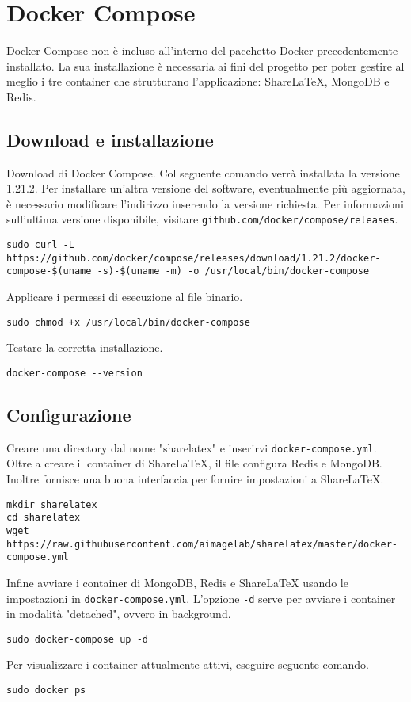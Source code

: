 \section{Docker Compose}
Docker Compose non è incluso all'interno del pacchetto Docker precedentemente installato. La sua installazione è necessaria ai fini del progetto per poter gestire al meglio i tre container che strutturano l'applicazione: ShareLaTeX, MongoDB e Redis.

\subsection{Download e installazione}
Download di Docker Compose. Col seguente comando verrà installata la versione 1.21.2. Per installare un'altra versione del software, eventualmente più aggiornata, è necessario modificare l'indirizzo inserendo la versione richiesta. Per informazioni sull'ultima versione disponibile, visitare \verb|github.com/docker/compose/releases|.
\begin{lstlisting}
sudo curl -L https://github.com/docker/compose/releases/download/1.21.2/docker-compose-$(uname -s)-$(uname -m) -o /usr/local/bin/docker-compose
\end{lstlisting}
Applicare i permessi di esecuzione al file binario.
\begin{lstlisting}
sudo chmod +x /usr/local/bin/docker-compose
\end{lstlisting}
Testare la corretta installazione.
\begin{lstlisting}
docker-compose --version
\end{lstlisting}

\subsection{Configurazione}
Creare una directory dal nome "sharelatex" e inserirvi \verb|docker-compose.yml|. Oltre a creare il container di ShareLaTeX, il file configura Redis e MongoDB. Inoltre fornisce una buona interfaccia per fornire impostazioni a ShareLaTeX.
\begin{lstlisting}
mkdir sharelatex
cd sharelatex
wget https://raw.githubusercontent.com/aimagelab/sharelatex/master/docker-compose.yml
\end{lstlisting}
Infine avviare i container di MongoDB, Redis e ShareLaTeX usando le impostazioni in \verb|docker-compose.yml|. L'opzione \verb|-d| serve per avviare i container in modalità "detached", ovvero in background.
\begin{lstlisting}
sudo docker-compose up -d
\end{lstlisting}
Per visualizzare i container attualmente attivi, eseguire seguente comando.
\begin{lstlisting}
sudo docker ps
\end{lstlisting}